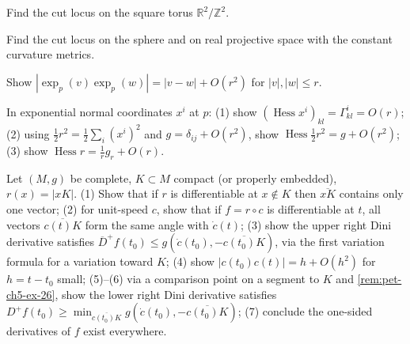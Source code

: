 \begin{remark}
  \label{rem:pet-ch5-ex-24}

  Find the cut locus on the square torus $\mathbb R^2/\mathbb Z^2$.
\end{remark}

\begin{remark}
  \label{rem:pet-ch5-ex-25}

  Find the cut locus on the sphere and on real projective space with the constant
  curvature metrics.
\end{remark}

\begin{remark}
  \label{rem:pet-ch5-ex-26}

  Show $|\exp_p(v)\exp_p(w)|=|v-w|+O(r^2)$ for $|v|,|w|\le r$.
\end{remark}

\begin{remark}
  \label{rem:pet-ch5-ex-27}

  In exponential normal coordinates $x^i$ at $p$: (1) show
  $(\operatorname{Hess}x^i)_{kl}=\Gamma^i_{kl}=O(r)$; (2) using
  $\tfrac12r^2=\tfrac12\sum_i(x^i)^2$ and $g=\delta_{ij}+O(r^2)$, show
  $\operatorname{Hess}\tfrac12r^2=g+O(r^2)$; (3) show $\operatorname{Hess}r=
  \tfrac1rg_r+O(r)$.
\end{remark}

\begin{remark}
  \label{rem:pet-ch5-ex-28}

  Let $(M,g)$ be complete, $K\subset M$ compact (or properly embedded), $r(x)=|xK|$.
  (1) Show that if $r$ is differentiable at $x\notin K$ then $\overline{xK}$
  contains only one vector; (2) for unit-speed $c$, show that if $f=r\circ c$ is
  differentiable at $t$, all vectors $\overline{c(t)K}$ form the same angle with
  $\dot c(t)$; (3) show the upper right Dini derivative satisfies
  $\overline D^+f(t_0)\le g(\dot c(t_0),-\overline{c(t_0)K})$, via the first
  variation formula for a variation toward $K$; (4) show
  $|c(t_0)c(t)|=h+O(h^2)$ for $h=t-t_0$ small; (5)–(6) via a comparison point on a
  segment to $K$ and \cref{rem:pet-ch5-ex-26}, show the lower right Dini derivative
  satisfies $D^+f(t_0)\ge\min_{\overline{c(t_0)K}}g(\dot c(t_0),-\overline{c(t_0)K})$;
  (7) conclude the one-sided derivatives of $f$ exist everywhere.
\end{remark}

